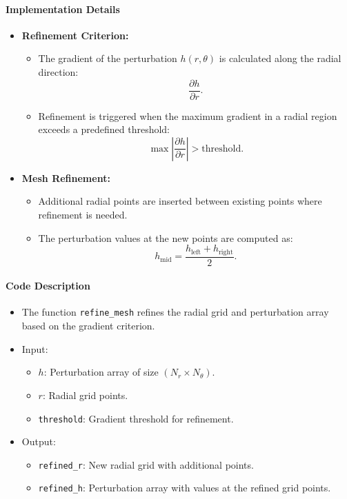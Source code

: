 \documentclass[12pt]{article}
\begin{document}
\paragraph{Implementation Details}
\begin{itemize}
    \item \textbf{Refinement Criterion:}
    \begin{itemize}
        \item The gradient of the perturbation $h(r, \theta)$ is calculated along the radial direction:
        \[
        \frac{\partial h}{\partial r}.
        \]
        \item Refinement is triggered when the maximum gradient in a radial region exceeds a predefined threshold:
        \[
        \max \left| \frac{\partial h}{\partial r} \right| > \text{threshold}.
        \]
    \end{itemize}
    \item \textbf{Mesh Refinement:}
    \begin{itemize}
        \item Additional radial points are inserted between existing points where refinement is needed.
        \item The perturbation values at the new points are computed as:
        \[
        h_{\text{mid}} = \frac{h_{\text{left}} + h_{\text{right}}}{2}.
        \]
    \end{itemize}
\end{itemize}

\paragraph{Code Description}
\begin{itemize}
    \item The function \texttt{refine\_mesh} refines the radial grid and perturbation array based on the gradient criterion.
    \item Input:
    \begin{itemize}
        \item $h$: Perturbation array of size $(N_r \times N_\theta)$.
        \item $r$: Radial grid points.
        \item \texttt{threshold}: Gradient threshold for refinement.
    \end{itemize}
    \item Output:
    \begin{itemize}
        \item \texttt{refined\_r}: New radial grid with additional points.
        \item \texttt{refined\_h}: Perturbation array with values at the refined grid points.
    \end{itemize}
\end{itemize}
\end{document}
